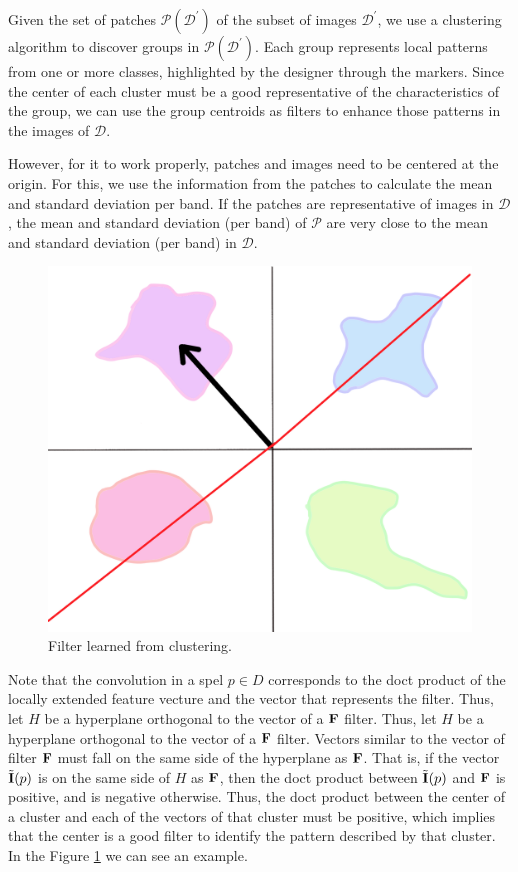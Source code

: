 \documentclass[a4paper,conference]{IEEEtran}
\newcommand{\D}{\mathcal{D}}
\newcommand{\m}[1]{{\mathrm{\bf #1}}}
\newcommand{\E}{\tilde{\m{I}}}
\newcommand{\mF}{\m{F}}
\newcommand{\Pa}{\mathcal{P}}
\newcommand{\pDD}{\D^\prime}
\begin{document}
Given the set of patches $\Pa(\pDD)$ of the subset of images $\pDD$, we use a clustering algorithm to discover groups in $\Pa(\pDD)$. Each group represents local patterns from one or more classes, highlighted by the designer through the markers. Since the center of each cluster must be a good representative of the characteristics of the group, we can use the group centroids as filters to enhance those patterns in the images of $\D$.

However, for it to work properly, patches and images need to be centered at the origin. For this, we use the information from the patches to calculate the mean and standard deviation per band. If the patches are representative of images in $\D$, the mean and standard deviation (per band) of $\Pa$ are very close to the mean and standard deviation (per band) in $\D$.

\begin{figure}
  \begin{center}
     \includegraphics[width=0.8\linewidth]{figures/filter.png}
  \end{center}
  \caption{Filter learned from clustering.}
  \label{fig:filter}
\end{figure}

Note that the convolution in a spel $p \in D$ corresponds to the doct product of the locally extended feature vecture and the vector that represents the filter. Thus, let $H$ be a hyperplane orthogonal to the vector of a $\mF$ filter. Thus, let $ H $ be a hyperplane orthogonal to the vector of a $ \mF$ filter. Vectors similar to the vector of filter $\mF$ must fall on the same side of the hyperplane as $\mF$. That is, if the vector $\E(p)$ is on the same side of $H$ as $\mF$, then the doct product between $\E (p)$ and $\mF$ is positive, and is negative otherwise. Thus, the doct product between the center of a cluster and each of the vectors of that cluster must be positive, which implies that the center is a good filter to identify the pattern described by that cluster. In the Figure \ref{fig:filter} we can see an example.
\end{document}
